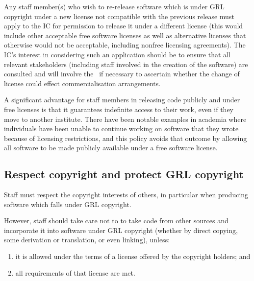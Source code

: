 \documentclass[10pt,a4paper]{article}
\begin{document}
\par Any staff member(s) who wish to re-release software which is under GRL 
copyright under a new license not compatible with the previous release must 
apply to the IC for permission to release it under a different license (this would 
include other acceptable free software licenses as well as alternative licenses 
that otherwise would not be acceptable, including nonfree licensing 
agreements). The IC's interest in considering such an application should be 
to ensure that all relevant stakeholders (including staff involved in the creation 
of the software) are consulted and will involve the \exectitle\ if necessary to 
ascertain whether the change of license could effect commercialisation 
arrangements. 

\par A significant advantage for staff members in releasing code publicly and 
under free licenses is that it guarantees indefinite access to their work, even 
if they move to another institute. There have been notable examples in 
academia where individuals have been unable to continue working on software 
that they wrote because of licensing restrictions, and this policy avoids that 
outcome by allowing all software to be made publicly available under a free 
software license. 



\subsection{Respect copyright and protect GRL copyright}
\label{section:policy.protection}

\par Staff must respect the copyright interests of others, in particular when producing 
software which falls under GRL copyright. 

\par %
However, staff should take care not to to take code from other sources 
and incorporate it into software under GRL copyright (whether by direct copying, 
some derivation or translation, or even linking), unless:
\begin{enumerate}
\item it is allowed under the terms of a license offered by the copyright holders; and
\item all requirements of that license are met.
\end{enumerate} 
\end{document}
